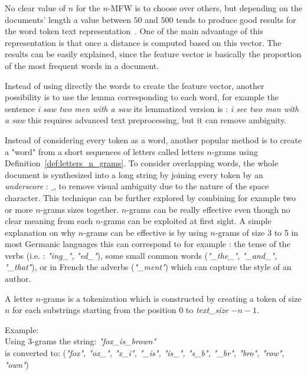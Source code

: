 No clear value of $n$ for the $n$-MFW is to choose over others, but depending on the documents' length a value between $50$ and $500$ tends to produce good results for the word token text representation~\cite{savoy_text_representation}.
One of the main advantage of this representation is that once a distance is computed based on this vector.
The results can be easily explained, since the feature vector is basically the proportion of the most frequent words in a document.

Instead of using directly the words to create the feature vector, another possibility is to use the lemma corresponding to each word, for example the sentence \textit{i saw two men with a saw} its lemmatized version is : \textit{i see two man with a saw} this requires advanced text preprocessing, but it can remove ambiguity.

Instead of considering every token as a word, another popular method is to create a "word" from a short sequences of letters called letters $n$-grams using Definition~\ref{def:letters_n_grams}.
To consider overlapping words, the whole document is synthesized into a long string by joining every token by an \textit{underscore} : $\_$, to remove visual ambiguity due to the nature of the space character.
This technique can be further explored by combining for example two or more $n$-grams sizes together.
$n$-grams can be really effective even though no clear meaning from each $n$-grams can be exploited at first sight.
A simple explanation on why $n$-grams can be effective is by using $n$-grams of size 3 to 5 in most Germanic languages this can correspond to for example : the tense of the verbs (i.e. : \textit{"ing\_"}, \textit{"ed\_"}), some small common words (\textit{"\_the\_"}, \textit{"\_and\_"}, \textit{"\_that"}), or in French the adverbs (\textit{"\_ment"}) which can capture the style of an author.

\begin{definition}
  \label{def:letters_n_grams}
  A letter $n$-grams is a tokenization which is constructed by creating a token of size $n$ for each substrings starting from the position $0$ to \textit{text\_size} $- n - 1$.

  Example: \\
  Using 3-grams the string: \textit{"fox\_is\_brown"} \\
  is converted to: (\textit{"fox", "ox\_", "x\_i", "\_is", "is\_", "s\_b", "\_br", "bro", "row", "own"})
\end{definition}

